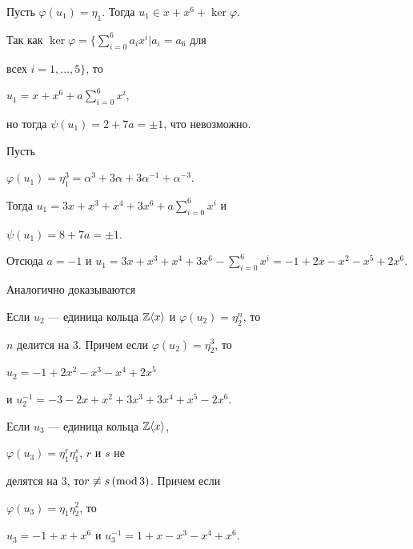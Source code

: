\begin{pf} 


Пусть $\varphi(u_1)=\eta_1$. Тогда $u_1\in x+x^6+\ker\varphi$. 


Так как $\ker\varphi=\Big\{\sum\limits^6_{i=0}a_i x^i\big|a_i=a_6$ для 


всех $i=1,\dotsc,5\Big\}$, то 


$u_1=x+x^6+a\sum\limits^6_{i=0}x^i$, 


но тогда $\psi(u_1)=2+7a=\pm1$, что невозможно. 


Пусть 


$\varphi(u_1)=\eta^3_1=\alpha^3+3\alpha+3\alpha^{-1}+\alpha^{-3}$. 


Тогда $u_1=3x+x^3+x^4+3x^6+a\sum\limits^6_{i=0}x^i$ и 


$\psi(u_1)=8+7a=\pm1$. 


Отсюда $a=-1$ и $u_1=3x+x^3+x^4+3x^6- 


\sum\limits^6_{i=0}x^i=-1+2x-x^2-x^5+2x^6$. 


\end{pf} 


 


Аналогично доказываются 


 


\begin{lem} 


Если $u_2$ --- единица кольца $\Bbb Z\langle x\rangle$ и $\varphi(u_2)=\eta^n_2$, то 


$n$ делится на $3$. Причем если $\varphi(u_2)=\eta^3_2$, то 


$u_2=-1+2x^2-x^3-x^4+2x^5$ 


и $u^{-1}_2=-3-2x+x^2+3x^3+3x^4+x^5-2x^6$. 


\end{lem} 


 


\begin{lem} 


Если $u_3$ --- единица кольца $\Bbb Z\langle x\rangle$, 


$\varphi(u_3)=\eta^r_1\eta^s_1$, $r$ и $s$ не 


делятся на $3$, то\linebreak $r\not\equiv s\,(\operatorname{mod} 3)$. Причем если 


$\varphi(u_3)=\eta_1\eta^2_2$, то  


$u_3=-1+x+x^6$ и $u^{-1}_3=1+x-x^3-x^4+x^6$. 


\end{lem} 


